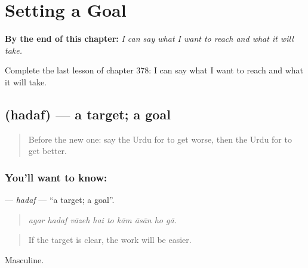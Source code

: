 
\chapter{Setting a Goal}
\label{ch:ur-setting-a-goal}

\begin{chapteropening}
\textbf{By the end of this chapter:} \emph{I can say what I want to reach and what it will take.}

Complete the last lesson of chapter 378: I can say what I want to reach and what it will take.
\end{chapteropening}

\section[\texorpdfstring{\ur{ہدف} (hadaf)}{ہدف (hadaf)}]{ (hadaf) — a target; a goal}

\label{lesson:UR-C378-hadaf}



\begin{quote}
Before the new one: say the Urdu for to get worse, then the Urdu for to get better.
\end{quote}

\subsection*{You'll want to know: }
\textbf{} — \emph{hadaf} — \textquotedblleft{}a target; a goal\textquotedblright{}.

\begin{quote}
        
\end{quote}

\begin{quote}
\emph{agar hadaf vāzeh hai to kām āsān ho gā.}
\end{quote}

\begin{quote}
If the target is clear, the work will be easier.
\end{quote}

Masculine.

